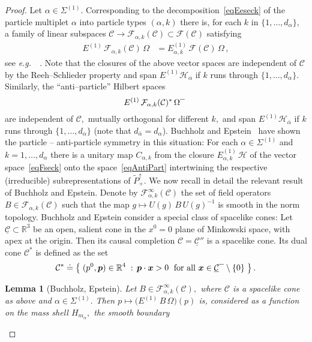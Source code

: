 \documentclass[a4paper,reqno,11pt]{amsart}
\theoremstyle{plain}
\newtheorem{Lem}[Thm]{Lemma}
\theoremstyle{definition}
\numberwithin{equation}{section}
\newcommand{\Bb}{\mathbb{R}}
\newcommand{\F}{{\mathcal F}}
\newcommand{\calH}{{\mathcal H}}
\newcommand{\calC}{{\mathcal C}}
\newcommand{\Potild}{\tilde{P}_+^{\uparrow}}
\newcommand{\bfp}{{\boldsymbol{p}}}
\newcommand{\bfx}{{\boldsymbol{x}}}
\newcommand{\clo}{ {\mbox{\bf --}} }
\newcommand{\Sec}{\Sigma} %
\renewcommand{\sec}{\alpha}
\newcommand{\Sece}{\Sec^{(1)}} %
\newcommand{\Hsec}{\calH_{\sec}}
\newcommand{\Hbarsec}{\calH_{\bar\sec}}
\newcommand{\msec}{{m_{\sec}}}
\newcommand{\Hesec}{\Ee\Hsec} %
\newcommand{\Hebarsec}{\Ee\Hbarsec} %
\newcommand{\Ee}{E^{(1)}}
\newcommand{\Eeseck}{\Ee_{\sec,k}}
\newcommand{\Cop}{C}        %
\newcommand{\cone}{\calC}   %
\begin{document}
\begin{proof}
Let $\sec\in\Sece.$ Corresponding to the decomposition~\eqref{eqEeseck} 
of the particle multiplet $\sec$ into particle types $(\sec,k)$ there
is, for each $k$ in $\{1,\ldots, d_\sec\},$ a family of linear subspaces 
$\cone\rightarrow \F_{\sec,k}(\cone)\subset \F(\cone)$ 
satisfying 
\begin{align} \label{eqFseck}
 \Ee\,\F_{\sec,k}(\cone)\,\Omega&=\Eeseck\,\F(\cone)\,\Omega\,,
\end{align} 
see {\it e.g.\ }~\cite{DK,DHRI}. Note that the closures of the above
vector spaces are independent of $\cone$ by the Reeh--Schlieder
property and span $\Hesec$ if $k$ runs through $\{1,\ldots,d_\sec\}.$ 
Similarly, the ``anti--particle'' Hilbert spaces 
\begin{equation}  \label{eqAntiPart}
\Ee\,\F_{\sec,k}(\cone)^*\,\Omega^\clo\;
\end{equation} 
are independent of $\cone,$ mutually orthogonal for different $k,$ and
span $\Hebarsec$ if $k$ runs through $\{1,\ldots,d_\sec\}$ 
(note that $d_{\bar\sec}=d_\sec$).  
Buchholz and Epstein~\cite{BuEp} have shown the particle --
anti-particle symmetry in this situation: 
For each $\sec\in\Sece$ and $k=1,\ldots,d_\sec$ there is a
unitary map $\Cop_{\sec,k}$ from the closure $\Eeseck\,\calH$  of the vector 
space~\eqref{eqFseck} onto 
the  space~\eqref{eqAntiPart} intertwining the respective 
(irreducible) subrepresentations of $\Potild$. 
We  now  recall in detail the relevant result of Buchholz and Epstein. 
Denote by $\F_{\sec,k}^\infty(\cone)$ the set of
field operators $B\in\F_{\sec,k}(\cone)$ such that the map 
$g\mapsto U(g)\,B\,U(g)^{-1}$ is 
smooth in the norm topology. Buchholz and Epstein
consider a special class of spacelike cones: Let 
$\underline{\cone}\subset \Bb^3$ be an open, salient cone in the $x^0=0$ 
plane of Minkowski space, with apex at the origin. Then its causal completion 
$\cone=\underline{\cone}''$ is a spacelike cone. Its dual cone $\cone^*$ is defined
as the set 
\[  \cone^*\doteq\big\{\; (p^0,\bfp)\in\Bb^4\;:\, 
\bfp\cdot\bfx>0\;\mbox{  for all } 
\bfx\in\underline{\cone}^\clo \setminus\{0\}\; \big\} \,.
\]
\begin{Lem}[Buchholz, Epstein] \label{LemBuEp} 
Let $B\in\F_{\sec,k}^\infty(\cone),$ where $\cone$ is a spacelike cone as
above and $\sec\in\Sece.$  
Then $p\mapsto \big(\Ee\,B\,\Omega\big)(p)$ is,
considered as a function on the mass shell $H_\msec,$ the smooth boundary

\end{Lem}
\end{proof}
\end{document}
